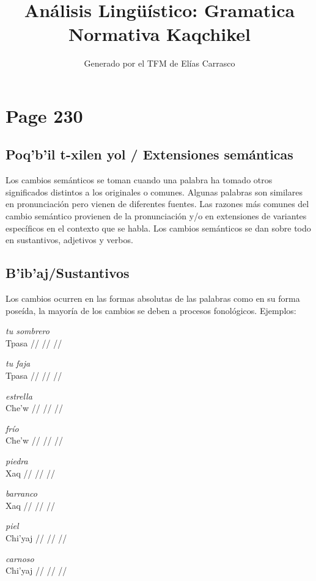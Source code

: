 \documentclass{article}%
\title{Análisis Lingüístico: Gramatica Normativa Kaqchikel}%
\author{Generado por el TFM de Elías Carrasco}%
\begin{document}
%
\normalsize%
\maketitle%
\section{Page 230}%
\label{sec:Page230}%
\subsection{Poq’b’il t{-}xilen yol / Extensiones semánticas}%
\label{subsec:Poqbilt{-}xilenyol/Extensionessemnticas}%

%
Los cambios semánticos se toman cuando una palabra ha tomado otros significados distintos a los originales o comunes. Algunas palabras son similares en pronunciación pero vienen de diferentes fuentes. %
Las razones más comunes del cambio semántico provienen de la pronunciación y/o en extensiones de variantes específicos en el contexto que se habla. %
Los cambios semánticos se dan sobre todo en sustantivos, adjetivos y verbos. %
\subsection{B’ib’aj/Sustantivos}%
\label{subsec:Bibaj/Sustantivos}%

%
Los cambios ocurren en las formas absolutas de las palabras como en su forma poseída, la mayoría de los cambios se deben a procesos fonológicos. %
Ejemplos: %
\par\medskip%
\ex
\textit{tu sombrero} \\
\begingl
\gla Tpasa //
\glb  //
\glc  //
\endgl
\xe
%
\medskip%
\par\medskip%
\ex
\textit{tu faja} \\
\begingl
\gla Tpasa //
\glb  //
\glc  //
\endgl
\xe
%
\medskip%
\par\medskip%
\ex
\textit{estrella} \\
\begingl
\gla Che’w //
\glb  //
\glc  //
\endgl
\xe
%
\medskip%
\par\medskip%
\ex
\textit{frío} \\
\begingl
\gla Che’w //
\glb  //
\glc  //
\endgl
\xe
%
\medskip%
\par\medskip%
\ex
\textit{piedra} \\
\begingl
\gla Xaq //
\glb  //
\glc  //
\endgl
\xe
%
\medskip%
\par\medskip%
\ex
\textit{barranco} \\
\begingl
\gla Xaq //
\glb  //
\glc  //
\endgl
\xe
%
\medskip%
\par\medskip%
\ex
\textit{piel} \\
\begingl
\gla Chi’yaj //
\glb  //
\glc  //
\endgl
\xe
%
\medskip%
\par\medskip%
\ex
\textit{carnoso} \\
\begingl
\gla Chi’yaj //
\glb  //
\glc  //
\endgl
\xe
%
\medskip

%
\end{document}
